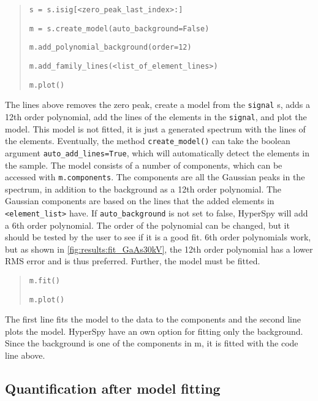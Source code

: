 \begin{quote}
    \verb|s = s.isig[<zero_peak_last_index>:]|

    \verb|m = s.create_model(auto_background=False)|

    \verb|m.add_polynomial_background(order=12)|

    \verb|m.add_family_lines(<list_of_element_lines>)|

    \verb|m.plot()|

\end{quote}

The lines above removes the zero peak, create a model from the \verb|signal| s, adds a 12th order polynomial, add the lines of the elements in the \verb|signal|, and plot the model.
This model is not fitted, it is just a generated spectrum with the lines of the elements.
Eventually, the method \verb|create_model()| can take the boolean argument \verb|auto_add_lines=True|, which will automatically detect the elements in the sample.
The model consists of a number of components, which can be accessed with \verb|m.components|.
The components are all the Gaussian peaks in the spectrum, in addition to the background as a 12th order polynomial.
The Gaussian components are based on the lines that the added elements in \verb|<element_list>| have.
If \verb|auto_background| is not set to false, HyperSpy will add a 6th order polynomial.
The order of the polynomial can be changed, but it should be tested by the user to see if it is a good fit.
6th order polynomials work, but as shown in \cref{fig:results:fit_GaAs30kV}, the 12th order polynomial has a lower RMS error and is thus preferred.
Further, the model must be fitted.

\begin{quote}
    \verb|m.fit()|


    \verb|m.plot()|
\end{quote}

The first line fits the model to the data to the components and the second line plots the model.
HyperSpy have an own option for fitting only the background.
Since the background is one of the components in m, it is fitted with the code line above.


\subsection{Quantification after model fitting}
\label{sec:discussion:steps:quantification:model}

